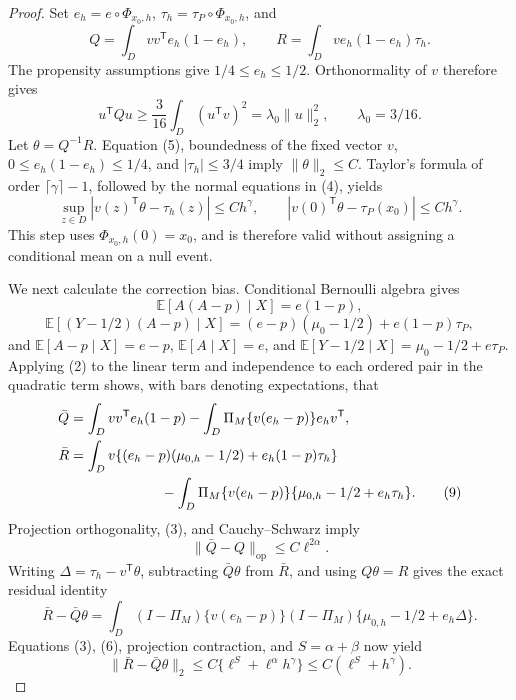 \documentclass{article}
\begin{document}
\begin{proof}
Set \(e_h=e\circ\Phi_{x_0,h}\), \(\tau_h=\tau_P\circ\Phi_{x_0,h}\), and
\[
 Q=\int_D vv^{\mathsf T}e_h(1-e_h),\qquad
 R=\int_Dv e_h(1-e_h)\tau_h .                                       \tag{4}
\]
The propensity assumptions give \(1/4\le e_h\le1/2\).  Orthonormality of \(v\) therefore gives
\[
 u^{\mathsf T}Qu\ge\frac3{16}\int_D(u^{\mathsf T}v)^2
 =\lambda_0\|u\|_2^2,\qquad \lambda_0=3/16.                         \tag{5}
\]
Let \(\theta=Q^{-1}R\).  Equation (5), boundedness of the fixed vector \(v\), \(0\le e_h(1-e_h)\le1/4\), and \(|\tau_h|\le3/4\) imply \(\|\theta\|_2\le C\).  Taylor's formula of order \(\lceil\gamma\rceil-1\), followed by the normal equations in (4), yields
\[
 \sup_{z\in D}|v(z)^{\mathsf T}\theta-\tau_h(z)|\le C h^\gamma,
 \qquad |v(0)^{\mathsf T}\theta-\tau_P(x_0)|\le Ch^\gamma.          \tag{6}
\]
This step uses \(\Phi_{x_0,h}(0)=x_0\), and is therefore valid without assigning a conditional mean on a null event.

We next calculate the correction bias.  Conditional Bernoulli algebra gives
\[
 \mathbb E[A(A-p)\mid X]=e(1-p),                                    \tag{7}
\]
\[
 \mathbb E[(Y-1/2)(A-p)\mid X]
 =(e-p)(\mu_0-1/2)+e(1-p)\tau_P,                                   \tag{8}
\]
and \(\mathbb E[A-p\mid X]=e-p\), \(\mathbb E[A\mid X]=e\), and
\(\mathbb E[Y-1/2\mid X]=\mu_0-1/2+e\tau_P\).  Applying (2) to the linear term and independence to each ordered pair in the quadratic term shows, with bars denoting expectations, that
\[
\begin{aligned}
 \bar Q&=\int_Dvv^{\mathsf T}e_h(1-p)
 -\int_D\Pi_M\{v(e_h-p)\}e_hv^{\mathsf T},\\
 \bar R&=\int_Dv\{(e_h-p)(\mu_{0,h}-1/2)+e_h(1-p)\tau_h\}\\
 &\hspace{23mm}-\int_D\Pi_M\{v(e_h-p)\}\{\mu_{0,h}-1/2+e_h\tau_h\}. \tag{9}
\end{aligned}
\]
Projection orthogonality, (3), and Cauchy--Schwarz imply
\[
 \|\bar Q-Q\|_{\mathrm{op}}\le C\ell^{2\alpha}.                    \tag{10}
\]
Writing \(\Delta=\tau_h-v^{\mathsf T}\theta\), subtracting \(\bar Q\theta\) from \(\bar R\), and using \(Q\theta=R\) gives the exact residual identity
\[
 \bar R-\bar Q\theta
 =\int_D(I-\Pi_M)\{v(e_h-p)\}
          (I-\Pi_M)\{\mu_{0,h}-1/2+e_h\Delta\}.                    \tag{11}
\]
Equations (3), (6), projection contraction, and \(S=\alpha+\beta\) now yield
\[
 \|\bar R-\bar Q\theta\|_2\le C\{\ell^S+\ell^\alpha h^\gamma\}
 \le C(\ell^S+h^\gamma).                                           \tag{12}
\]


\end{proof}
\end{document}
